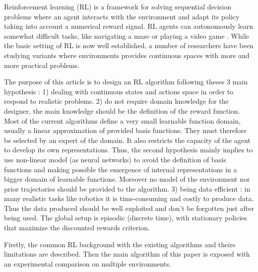 Reinforcement learning (RL) \cite{Sutton1998} is a framework for solving sequential decision
problems where an agent interacts with the environment and adapt its policy
taking into account a numerical reward signal. RL agents can autonomously
learn somewhat difficult tasks, like navigating a maze or playing a video game \cite{Tesauro1994}.
While the basic setting of RL is now well established, a number of researchers have been
studying variants where environments provides continuous spaces with more and more practical problems.

The purpose of this article is to design an RL algorithm following theses 3 main hypothesis :
1) dealing with continuous states and actions space in order to respond to realistic problems.
2) do not require domain knowledge for the designer, the main knowledge should be the definition of the reward function.
Most of the current algorithms define a very small learnable function domain, usually a linear approximation
of provided basis functions. They must therefore be selected by an expert of the domain. It also restricts 
the capacity of the agent to develop its own representations. %
Thus, the second hypothesis mainly implies to use non-linear model (as neural networks) to avoid the definition of basis functions and
making possible the emergence of internal representations in a bigger domain of learnable functions.
Moreover no model of the environment nor prior trajectories should be provided to the algorithm.
3) being data efficient : in many realistic tasks like robotics it is time-consuming and costly to produce data.
Thus the data produced should be well exploited and don't be forgotten just after being used.
The global setup is episodic (discrete time), with stationary policies that maximize the
discounted rewards criterion.


Firstly, the common RL background with the existing algorithms and theirs limitations are described.
Then the main algorithm of this paper is exposed with an experimental comparison on multiple environments.
